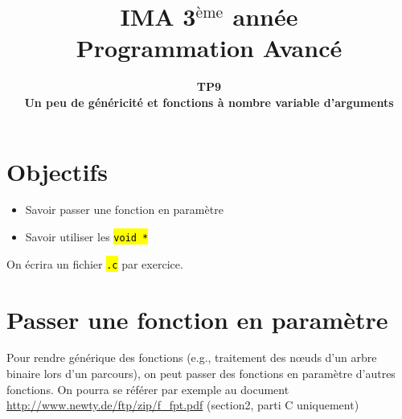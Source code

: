 \documentclass[final, pdftex, a4paper, openbib, ]{article}
\title{IMA 3$^{\mbox{\`eme}}$ année\\ Programmation Avancé
}
\author{\huge \textbf{TP9}\\
	\LARGE \textbf{Un peu de généricité et fonctions à nombre variable d'arguments}}
\date{}
\let\OldTexttt\texttt
\renewcommand{\texttt}[1]{\OldTexttt{\hl{#1}}}
\begin{document}
\posttitle{\par\end{center}}
\setlength{\droptitle}{-45pt}
\maketitle

\vspace{-1cm}
\section{Objectifs}

\begin{itemize}
	\item Savoir passer une fonction en paramètre
	\item Savoir utiliser les \texttt{void *}
\end{itemize}
On écrira un fichier \texttt{.c} par exercice.



\section{Passer une fonction en paramètre}

Pour rendre générique des fonctions (e.g., traitement des nœuds d'un arbre binaire lors d'un parcours), on peut passer des fonctions en paramètre d'autres fonctions.
On pourra se référer par exemple au document \url{http://www.newty.de/ftp/zip/f_fpt.pdf} (section2, parti C uniquement)
\end{document}
